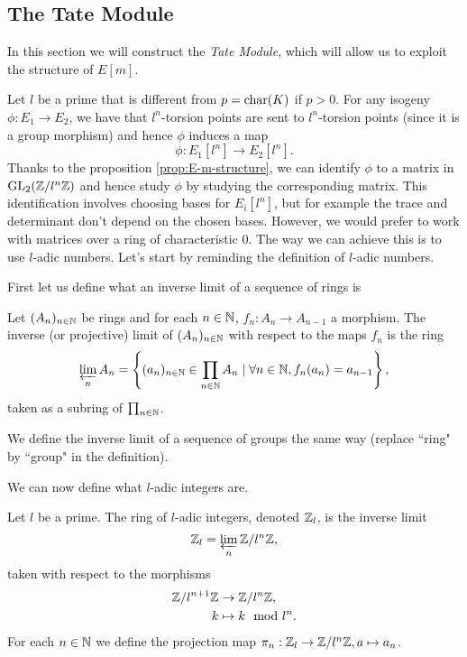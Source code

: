 \subsection{The Tate Module}


In this section we will construct the \emph{Tate Module},
which will allow us to exploit the structure of $E[m]$.

Let $l$ be a prime that is different from $p = \operatorname{char}(K)$ if $p > 0$.
For any isogeny
$\phi: E_1 \to E_2$, we have that $l^n$-torsion points are sent to
$l^n$-torsion points (since it is a group morphism)
and hence $\phi$ induces a map
\begin{equation*}
	\phi: E_1[l^n]\to E_2[l^n].
\end{equation*}
Thanks to the proposition \ref{prop:E-m-structure}, we can identify
$\phi$ to a matrix in $\operatorname{GL}_2(\mathbb{Z}/l^n\mathbb{Z})$ and hence study $\phi$ by studying
the corresponding matrix. This identification involves choosing bases
for $E_i[l^n]$,
but for example the trace and determinant don't depend on the chosen bases.
However, we would prefer to work with matrices over a ring of characteristic
0. The way we can achieve this is to use $l$-adic numbers. Let's start by
reminding the definition of $l$-adic numbers.

First let us define what an inverse limit of a sequence of rings is
\begin{definition}
	Let $(A_n)_{n \in \mathbb{N}}$ be rings and for each $n\in \mathbb{N}$,
	$f_n: A_n \to A_{n-1}$ a morphism. The inverse (or projective)
	limit of $(A_n)_{n\in\mathbb{N}}$
	with respect to the maps $f_n$ is the ring
	\begin{equation*}
		\varprojlim_n A_n = 
		\left\{(a_n)_{n \in \mathbb{N}} \in \prod_{n\in\mathbb{N}}A_n \mid
		\forall n \in \mathbb{N}, f_n(a_n) = a_{n-1} \right\},
	\end{equation*}
	taken as a subring of $\prod_{n\in \mathbb{N}}$.

	We define the inverse limit of a sequence of groups the same way
	(replace ``ring" by ``group" in the definition).
\end{definition}

We can now define what $l$-adic integers are.

\begin{definition}
	Let $l$ be a prime. The ring of $l$-adic integers, denoted $\mathbb{Z}_l$,
	is the inverse limit
	\begin{equation*}
		\mathbb{Z}_l = \varprojlim_n \mathbb{Z}/l^n\mathbb{Z},
	\end{equation*}
	taken with respect to the morphisms
	\begin{align*}
		\mathbb{Z}/l^{n+1}\mathbb{Z} &\to \mathbb{Z}/l^n\mathbb{Z}, \\
		k &\mapsto k \mod l^n.
	\end{align*}
	For each $n \in \mathbb{N}$ we define the projection map 
	$\pi_n: \mathbb{Z}_l \to \mathbb{Z}/l^n\mathbb{Z}, a \mapsto a_n$.
\end{definition}

